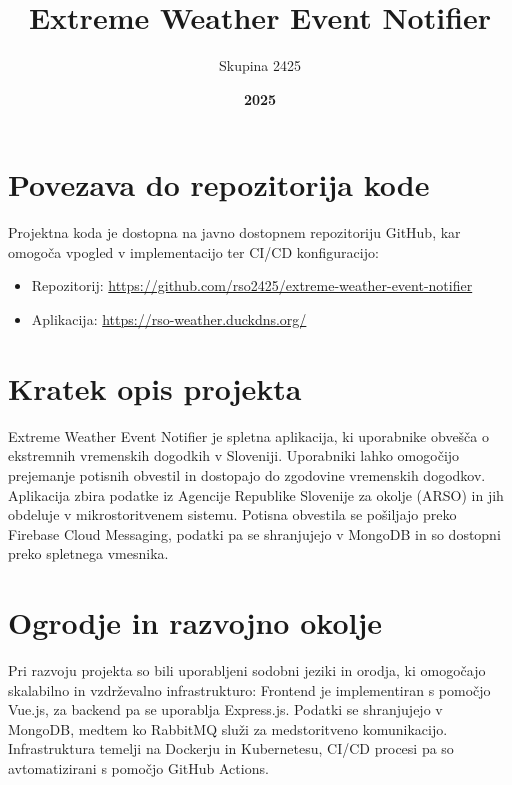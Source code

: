 \documentclass[a4paper,11pt]{article}
\title{\textbf{Extreme Weather Event Notifier}}
\author{Skupina 2425}
\date{\textbf{2025}}
\begin{document}
\maketitle

\newpage

\section*{Povezava do repozitorija kode}
Projektna koda je dostopna na javno dostopnem repozitoriju GitHub, kar omogo\v{c}a vpogled v implementacijo ter CI/CD konfiguracijo:
\begin{itemize}
    \item Repozitorij: \url{https://github.com/rso2425/extreme-weather-event-notifier}
    \item Aplikacija: \url{https://rso-weather.duckdns.org/}
\end{itemize}

\section*{Kratek opis projekta}
Extreme Weather Event Notifier je spletna aplikacija, ki uporabnike obve\v{s}\v{c}a o ekstremnih vremenskih dogodkih v Sloveniji. Uporabniki lahko omogo\v{c}ijo prejemanje potisnih obvestil in dostopajo do zgodovine vremenskih dogodkov. Aplikacija zbira podatke iz Agencije Republike Slovenije za okolje (ARSO) in jih obdeluje v mikrostoritvenem sistemu. Potisna obvestila se po\v{s}iljajo preko Firebase Cloud Messaging, podatki pa se shranjujejo v MongoDB in so dostopni preko spletnega vmesnika.

\section*{Ogrodje in razvojno okolje}
Pri razvoju projekta so bili uporabljeni sodobni jeziki in orodja, ki omogo\v{c}ajo skalabilno in vzdr\v{z}evalno infrastrukturo:
Frontend je implementiran s pomo\v{c}jo Vue.js, za backend pa se uporablja Express.js. Podatki se shranjujejo v MongoDB, medtem ko RabbitMQ slu\v{z}i za medstoritveno komunikacijo. Infrastruktura temelji na Dockerju in Kubernetesu, CI/CD procesi pa so avtomatizirani s pomo\v{c}jo GitHub Actions.
\newpage
\end{document}
